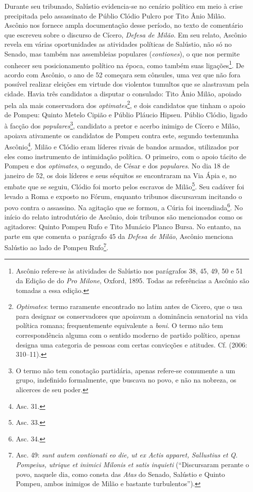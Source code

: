 Durante seu tribunado, Salústio evidencia-se no cenário político em meio à
crise precipitada pelo assassinato de Públio Clódio Pulcro por Tito Ânio Milão.
Ascônio nos fornece ampla documentação desse período, no texto de comentário
que escreveu sobre o discurso de Cícero, \emph{Defesa de Milão}. Em seu relato,
Ascônio revela em várias oportunidades as atividades políticas de Salústio, não
só no Senado, mas também nas assembleias populares (\emph{contiones}), o que
nos permite conhecer seu posicionamento político na época, como também suas
ligações\footnote{Ascônio refere-se às atividades de Salústio nos parágrafos
38, 45, 49, 50 e 51 da Edição de  do \emph{Pro Milone}, Oxford, 1895.
Todas as referências a Ascônio são tomadas a essa edição.}.
De acordo com Ascônio, o ano de 52 começara sem cônsules, uma vez que não fora possível realizar eleições em virtude dos violentos tumultos que
se alastravam pela cidade. Havia três candidatos a disputar o consulado: Tito
Ânio Milão, apoiado pela ala mais conservadora dos \emph{optimates}\footnote{\emph{Optimates}: termo raramente encontrado no latim antes de Cicero, que o
usa para designar os conservadores que apoiavam a dominância senatorial na vida
política romana; frequentemente equivalente a \emph{boni}. O termo não tem
correspondência alguma com o sentido moderno de partido político, apenas
designa uma categoria de pessoas com certas convicções e atitudes. Cf. 
(2006: 310--11).}, e dois candidatos que tinham o apoio de Pompeu: Quinto
Metelo Cipião e Públio Pláucio Hipseu. Públio Clódio, ligado à facção dos
\emph{populares}\footnote{O termo não tem conotação partidária, apenas
refere-se comumente a um grupo, indefinido formalmente, que buscava no povo, e não na nobreza, os alicerces de seu poder.}, candidato a pretor e acerbo inimigo de Cícero e Milão,  apoiava
ativamente os candidatos de Pompeu contra este, segundo testemunha
Ascônio\footnote{Asc. 31.}.  Milão e Clódio eram líderes rivais de bandos
armados, utilizados por eles como instrumento de intimidação política.  O
primeiro, com o apoio tácito de Pompeu e dos \emph{optimates}, o segundo, de
César e dos \emph{populares}. No dia 18 de janeiro de 52, os dois líderes e
seus séquitos se encontraram na Via Ápia e, no embate que se seguiu, Clódio foi
morto pelos escravos de Milão\footnote{Asc. 33.}. Seu cadáver foi levado a
Roma e exposto no Fórum, enquanto tribunos discursavam incitando o povo contra
o assassino. Na agitação que se formou, a Cúria foi incendiada\footnote{Asc. 34.}.
No início do relato introdutório de Ascônio, dois tribunos são mencionados como
os agitadores: Quinto Pompeu Rufo e Tito Munácio Planco Bursa.  No entanto, na
parte em que comenta o parágrafo 45 da \emph{Defesa de Milão}, Ascônio menciona
Salústio ao lado de Pompeu Rufo\footnote{ Asc. 49: \emph{sunt autem contionati
eo die, ut ex Actis apparet, Sallustius et Q. Pompeius, utrique et inimici
Milonis et satis inquieti} (``Discursaram perante o povo, naquele dia, como consta das \emph{Atas} do Senado, Salústio e Quinto Pompeu, ambos inimigos de Milão e bastante
turbulentos'').}.

